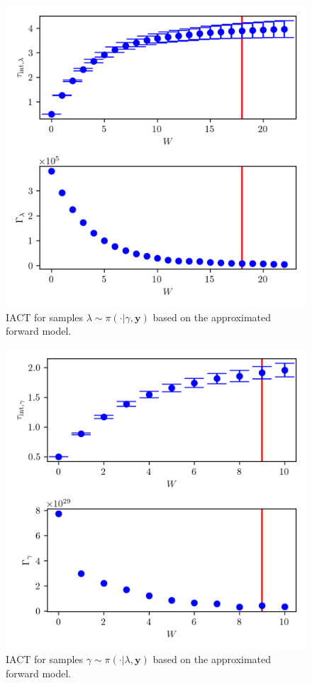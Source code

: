 \begin{figure}[ht!]
	\centering
	\includegraphics{UwerrTauIntSecO3lam.png}
	\caption[IACT and autocorrelation function for samples $\lambda \sim \pi{\cdot | \gamma, \bm{y}}$.]{IACT for samples $\lambda \sim \pi( \cdot | \gamma, \bm{y})$ based on the approximated forward model.}
	\label{fig:}
\end{figure}
\begin{figure}[ht!]
	\centering
	\includegraphics{UwerrTauIntSecO3gam.png}
	\caption[IACT and autocorrelation function for samples $\gamma \sim \pi( \cdot | \lambda, \bm{y})$]{IACT for samples $\gamma \sim \pi( \cdot | \lambda, \bm{y})$ based on the approximated forward model.}
	\label{fig:}
\end{figure}
\clearpage
